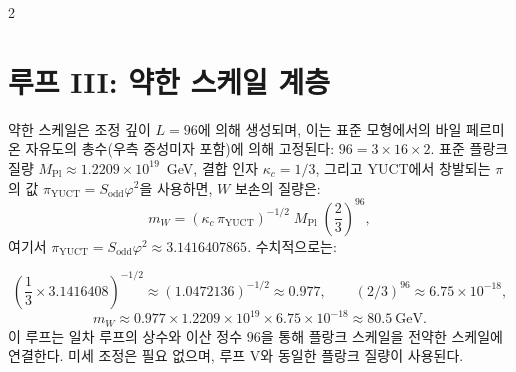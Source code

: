 \documentclass[12pt,a4paper]{article}
\begin{document}
\begin{multicols}{2}
		\section{루프 III: 약한 스케일 계층}
		
		약한 스케일은 조정 깊이 \(L = 96\)에 의해 생성되며, 이는 표준 모형에서의 바일 페르미온 자유도의 총수(우측 중성미자 포함)에 의해 고정된다: \(96 = 3 \times 16 \times 2\). 표준 플랑크 질량 \(M_{\mathrm{Pl}} \approx 1.2209 \times 10^{19}\)~GeV, 결합 인자 \(\kappa_c = 1/3\), 그리고 YUCT에서 창발되는 \(\pi\)의 값 \(\pi_{\mathrm{YUCT}} = S_{\mathrm{odd}}\varphi^2\)을 사용하면, \(W\) 보손의 질량은:
		\begin{equation}
			\boxed{m_W = \left( \kappa_c \, \pi_{\mathrm{YUCT}} \right)^{-1/2} \; M_{\mathrm{Pl}} \; \left( \frac{2}{3} \right)^{96}},
		\end{equation}
		여기서 \(\pi_{\mathrm{YUCT}} = S_{\mathrm{odd}}\varphi^2 \approx 3.1416407865\). 수치적으로는:
	\end{multicols}
	\small
	\[
	\left( \frac{1}{3} \times 3.1416408 \right)^{-1/2} \approx (1.0472136)^{-1/2} \approx 0.977,\qquad 
	(2/3)^{96} \approx 6.75 \times 10^{-18},
	\]
	\[
	m_W \approx 0.977 \times 1.2209 \times 10^{19} \times 6.75 \times 10^{-18} \approx 80.5\ \text{GeV}.
	\]
	이 루프는 일차 루프의 상수와 이산 정수 \(96\)을 통해 플랑크 스케일을 전약한 스케일에 연결한다. 미세 조정은 필요 없으며, 루프 V와 동일한 플랑크 질량이 사용된다.
\end{document}
